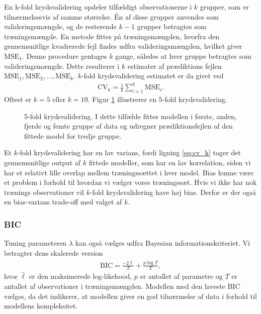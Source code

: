 En k-fold krydsvalidering opdeler tilfældigt observationerne i \(k\) grupper, som er tilnærmelsesvis af samme størrelse.
Én af disse grupper anvendes som valideringsmængde, og de resterende \(k-1\) grupper betragtes som træningsmængde.
En metode fittes på træningsmængden, hvorfra den gennemsnitlige kvadrerede fejl findes udfra valideringsmængden, hvilket giver \(\text{MSE}_1\).
Denne procedure gentages \(k\) gange, således at hver gruppe betragtes som valideringsmængde.
Dette resulterer i \(k\) estimater af prædiktions fejlen $\text{MSE}_1, \text{MSE}_2, \dots , \text{MSE}_k$.
\(k\)-fold krydsvalidering estimatet er da givet ved
\begin{align}
\text{CV}_k = \frac{1}{k} \sum_{i=1}^k \text{MSE}_i. \label{eq:cv_k}
\end{align}
Oftest er $k=5$ eller $k = 10$. 
Figur \ref{fig:cv_teori} illustrerer en 5-fold krydsvalidering. 
%
\begin{figure}
\center
\scalebox{0.6}{}
\caption{5-fold krydsvalidering. I dette tilfælde fittes modellen i første, anden, fjerde og femte gruppe af data og udregner prædiktionsfejlen af den fittede model for tredje gruppe.} \label{fig:cv_teori}
\end{figure} 
%
Et $k$-fold krydsvalidering har en lav varians, fordi ligning \eqref{eq:cv_k} tager det gennemsnitlige output af $k$ fittede modeller, som har en lav korrelation, siden vi har et relativt lille overlap mellem træningssættet i hver model. 
Bias kunne være et problem i forhold til hvordan vi vælger vores træningssæt. Hvis vi ikke har nok trænings observationer vil $k$-fold krydsvalidering have høj bias. Derfor er der også en bias-varians trade-off med valget af $k$. 



\subsubsection{BIC}
Tuning parameteren \(\lambda\) kan også vælges udfra Bayesian informationskriteriet.
Vi betragter dens skalerede version
%
\begin{align*}
\text{BIC} =  \frac{- 2 \widehat{\ell}}{T} + \frac{p \log T}{T}, 
\end{align*}
hvor \(\widehat{\ell}\) er den maksimerede log-likehood, \(p\) er antallet af parametre og \(T\) er antallet af observationer i træningsmængden.
%
Modellen med den laveste BIC vælges, da det indikerer, at modellen giver en god tilnærmelse af data i forhold til modellens kompleksitet. 

